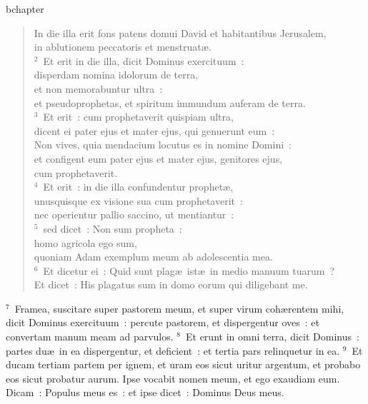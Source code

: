 bchapter\begin{verse}\vspace{-19pt}In die illa erit fons patens domui David et habitantibus Jerusalem,\\ in ablutionem peccatoris et menstruat\ae .\\
${}^{2}$~Et erit in die illa, dicit Dominus exercituum~:\\ disperdam nomina idolorum de terra,\\ et non memorabuntur ultra~:\\ et pseudoprophetas, et spiritum immundum auferam de terra.\\
${}^{3}$~Et erit~: cum prophetaverit quispiam ultra,\\ dicent ei pater ejus et mater ejus, qui genuerunt eum~:\\ Non vives, quia mendacium locutus es in nomine Domini~:\\ et configent eum pater ejus et mater ejus, genitores ejus,\\ cum prophetaverit.\\
${}^{4}$~Et erit~: in die illa confundentur prophet\ae ,\\ unusquisque ex visione sua cum prophetaverit~:\\ nec operientur pallio saccino, ut mentiantur~:\\
${}^{5}$~sed dicet~: Non sum propheta~:\\ homo agricola ego sum,\\ quoniam Adam exemplum meum ab adolescentia mea.\\
${}^{6}$~Et dicetur ei~: Quid sunt plag\ae\ ist\ae\ in medio manuum tuarum~?\\ Et dicet~: His plagatus sum in domo eorum qui diligebant me.\end{verse}


${}^{7}$~Framea, suscitare super pastorem meum, et super virum coh\ae rentem mihi, dicit Dominus exercituum~: percute pastorem, et dispergentur oves~: et convertam manum meam ad parvulos.
${}^{8}$~Et erunt in omni terra, dicit Dominus~: partes du\ae\ in ea dispergentur, et deficient~: et tertia pars relinquetur in ea.
${}^{9}$~Et ducam tertiam partem per ignem, et uram eos sicut uritur argentum, et probabo eos sicut probatur aurum. Ipse vocabit nomen meum, et ego exaudiam eum. Dicam~: Populus meus es~: et ipse dicet~: Dominus Deus meus.

